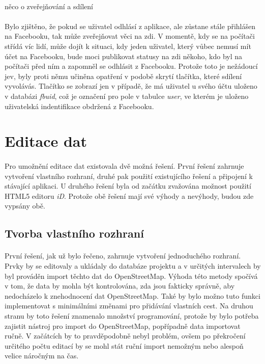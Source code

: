 \documentclass[11pt,a4paper,titlepage,oneside]{book}
\begin{document}
				\paragraph{} {\Huge něco o zveřejňování a sdílení}
				\paragraph{} Bylo zjištěno, že pokud se uživatel odhlásí z aplikace, ale zůstane stále přihlášen na Facebooku, tak může zveřejňovat věci na zdi. V momentě, kdy se na počítači střídá víc lidí, může dojít k situaci, kdy jeden uživatel, který vůbec nemusí mít účet na Facebooku, bude moci publikovat statusy na zdi někoho, kdo byl na počítači před ním a zapomněl se odhlásit z Facebooku. Protože toto je nežádoucí jev, byly proti němu učiněna opatření v podobě skrytí tlačítka, které sdílení vyvolávás. Tlačítko se zobrazí jen v případě, že má uživatel u svého účtu uloženo v databázi \textit{fbuid}, což je označení pro pole v tabulce \textit{user}, ve kterém je uloženo uživatelská indentifikace obdržená z Facebooku.
		
		\section{Editace dat}
				\paragraph{} Pro umožnění editace dat existovala dvě možná řešení. První řešení zahrnuje vytvoření vlastního rozhraní, druhé pak použití existujícího řešení a připojení k stávající aplikaci. U druhého řešení byla od začátku zvažována možnost použití HTML5 editoru \textit{iD}. Protože obě řešení mají své výhody a nevýhody, budou zde vypsány obě.
			\subsection{Tvorba vlastního rozhraní}
				\paragraph{} První řešení, jak už bylo řečeno, zahrnuje vytvoření jednoduchého rozhraní. Prvky by se editovaly a  ukládaly do databáze projektu a v určitých intervalech by byl prováděn import těchto dat do OpenStreetMap. Výhoda této metody spočívá v tom, že data by mohla být kontrolována, zda jsou fakticky správně, aby nedocházelo k znehodnocení dat OpenStreetMap. Také by bylo možno tuto funkci implementovat s minimálními změnami pro přidávání vlastních cest. Na druhou stranu by toto řešení znamenalo množství programování, protože by bylo potřeba zajistit nástroj pro import do OpenStreetMap, popřípadně data importovat ručně. V začátcích by to pravděpodobně nebyl problém, ovšem po překročení určitého počtu editací by se mohl stát ruční import nemožným nebo alespoň velice náročným na čas.
\end{document}
